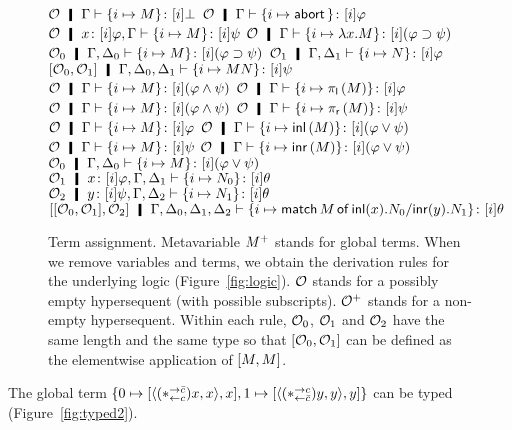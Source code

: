 {\begin{figure}[p]
 \UnaryRule
   {$\hypert\hmid\Gamma\tr \tj {\imapsto M}{[i]\bot}$} {}
   {$\hypert\hmid\Gamma\tr \tj{\imapsto{\abort}}{[i]\varphi}$}
  \UnaryRule
   {$\hypert\hmid\tj x{[i]\varphi},\Gamma\tr \tj {\imapsto{M}}{[i]\psi}$}
   {}
   {$\hypert\hmid\Gamma\tr \tj{\imapsto{\lambda x.M}}{[i](\varphi\supset\psi)}$}
 \BinaryRule
 {$\hypert_0\hmid\G,\D_0 \tr \tj {\imapsto{M}}{[i](\varphi\supset \psi)}$}
 {$\hypert_1\hmid\G,\D_1 \tr \tj {\imapsto{N}}{[i]\varphi}$}
 {}
 {$\cotuple{\hypert_0,\hypert_1}\hmid\G,\D_0,\D_1\tr \tj{\imapsto{MN}}{[i]\psi}$}
  \UnaryRule
   {$\hypert\hmid\Gamma\tr \tj{\imapsto{M}}{[i](\phi\land\psi)}$}
   {}
   {$\hypert\hmid\Gamma\tr \tj{\imapsto{\lpil{M}}}{[i]\phi}$}
   \hfill
  \UnaryRule
   {$\hypert\hmid\Gamma\tr \tj{\imapsto{M}}{[i](\varphi\wedge\psi)}$}
   {}
   {$\hypert\hmid\Gamma\tr \tj{\imapsto{\lpir M}}{[i]\psi}$}
  \UnaryRule
   {$\hypert\hmid\Gamma\tr \tj{\imapsto{M}}{[i]\varphi}$}
   {}
   {$\hypert\hmid\Gamma\tr \tj{\imapsto{\linl{M}}}{[i](\varphi\vee\psi)}$}
   \hfill
  \UnaryRule
   {$\hypert\hmid\Gamma\tr \tj{\imapsto{M}}{[i]\psi}$}
   {}
   {$\hypert\hmid\Gamma\tr \tj{\imapsto{\linr{M}}}{[i](\varphi\vee\psi)}$}
\TrinaryRule
   {$\hypert_0\hmid\G,\D_0\tr \tj{\imapsto{M}}{[i](\phi\lor\psi)}$}
   {$\hypert_1\hmid\tj x{[i]\phi},\G,\D_1\tr \tj{\imapsto{N_0}}{[i]\theta}$}
   {$\hypert_2\hmid\tj y{[i]\psi},\G,\D_2\tr \tj{\imapsto{N_1}}{[i]\theta}$}
   {}
   {$\cotuple{\cotuple{\hypert_0,\hypert_1},\hypert_2}\hmid\G,\D_0,\D_1,\D_2 \tr
 \tj{\imapsto{\mat M x {N_0} y {N_1}}}{[i]\theta}$}
 \caption[Term assignment of \lgd.]
 {Term assignment.
 Metavariable ${M}^+$ stands for global terms.
 When we remove variables and terms, we obtain the derivation rules for
 the underlying logic (Figure~\ref{fig:logic}).
 $\mathcal{O}$ stands for
 a possibly empty hypersequent (with possible subscripts).
 $\mathcal{O}^+$ stands for a non-empty hypersequent.
 Within each rule, $\mathcal{O}_0$, $\mathcal{O}_1$ and $\mathcal{O}_2$ have the
 same length and the same type so that $[{\mathcal{O}_0,\mathcal{O}_1}]$
 can be defined as
 the elementwise application of $[{M,M}]$. 
 }
 \label{termassign}
\end{figure}

 \begin{example}
The global term
$
\{0\mapsto
[{\langle{(\ast^{\rightarrow {\bar{c}}}_{\leftarrow{c}})x, x}\rangle, x}]
,1\mapsto
[{\langle{(\ast^{\rightarrow {c}}_{\leftarrow{\bar{c}}})y, y}\rangle, y}]
\}$
 can be typed (Figure~\ref{fig:typed2}).
 \end{example}

}
